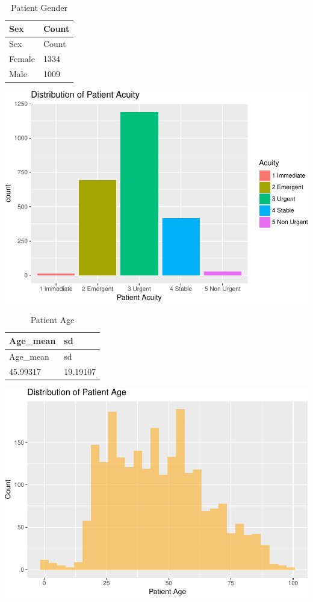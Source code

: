 \documentclass[]{elsarticle} %
\makeatletter
\def\maxwidth{\ifdim\Gin@nat@width>\linewidth\linewidth
\else\Gin@nat@width\fi}
\let\Oldincludegraphics\includegraphics
\renewcommand{\includegraphics}[1]{\Oldincludegraphics[width=\maxwidth]{#1}}
\makeatother
\begin{document}
\begin{longtable}[]{@{}ll@{}}
\caption{Patient Gender}\tabularnewline
\toprule
Sex & Count\tabularnewline
\midrule
\endfirsthead
\toprule
Sex & Count\tabularnewline
\midrule
\endhead
Female & 1334\tabularnewline
Male & 1009\tabularnewline
\bottomrule
\end{longtable}

\includegraphics{Flynn_Project_files/figure-latex/Participants-3.pdf}

\begin{longtable}[]{@{}ll@{}}
\caption{Patient Age}\tabularnewline
\toprule
Age\_mean & sd\tabularnewline
\midrule
\endfirsthead
\toprule
Age\_mean & sd\tabularnewline
\midrule
\endhead
45.99317 & 19.19107\tabularnewline
\bottomrule
\end{longtable}

\includegraphics{Flynn_Project_files/figure-latex/Participants-4.pdf}
\end{document}
